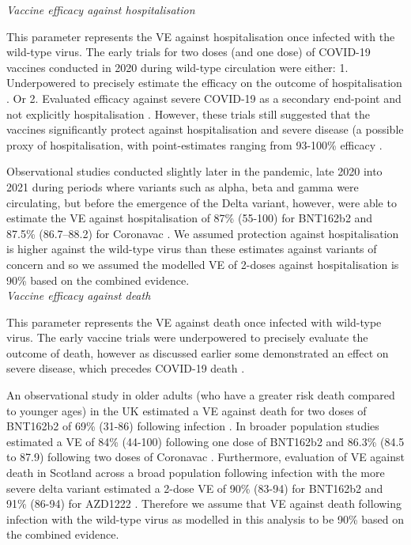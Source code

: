 \textit{Vaccine efficacy against hospitalisation}

This parameter represents the VE against hospitalisation once infected with the wild-type virus.
The early trials for two doses (and one dose) of COVID-19 vaccines conducted in 2020 during wild-type circulation were either:
1. Underpowered to precisely estimate the efficacy on the outcome of hospitalisation \cite{falsey2021, tanriover2021}.
Or
2. Evaluated efficacy against severe COVID-19 as a secondary end-point and not explicitly hospitalisation  \cite{elsahly2021, thomas2021, ella2021, alkaabi2021}.
However, these trials still suggested that the vaccines significantly protect against hospitalisation and severe disease (a possible proxy of hospitalisation, with point-estimates ranging from 93-100\% efficacy \cite{falsey2021, tanriover2021, elsahly2021, thomas2021, ella2021, alkaabi2021}.

Observational studies conducted slightly later in the pandemic, late 2020 into 2021 during periods where variants such as alpha, beta and gamma were circulating, but before the emergence 
of the Delta variant, however, were able to estimate the VE against hospitalisation of 87\% (55-100) for BNT162b2 and 87.5\%
(86.7–88.2) for Coronavac \cite{dagan2021, jara2021}. We assumed protection against hospitalisation is higher against the wild-type virus than these estimates against variants of concern 
and so we assumed the modelled VE of 2-doses against hospitalisation is 90\% based on the combined evidence.\\

\textit{Vaccine efficacy against death}

This parameter represents the VE against death once infected with wild-type virus.
The early vaccine trials were underpowered to precisely evaluate the outcome of death, however as discussed earlier some 
demonstrated an effect on severe disease, which precedes COVID-19 death \cite{elsahly2021, thomas2021, ella2021, alkaabi2021}.

An observational study in older adults (who have a greater risk death compared to younger ages) in the UK estimated a VE against death 
for two doses of BNT162b2 of 69\% (31-86) following infection \cite{lopez2021}. In broader population studies estimated a VE of 
84\% (44-100) following one dose of BNT162b2 and 86.3\% (84.5 to 87.9) following two doses of Coronavac \cite{dagan2021, jara2021}. 
Furthermore, evaluation of VE against death in Scotland across a broad population following infection with the more severe delta variant estimated a 2-dose VE of 90\% (83-94) for BNT162b2 and 91\% (86-94) for AZD1222 \cite{sheikh2021}. 
Therefore we assume that VE against death following infection with the wild-type virus as modelled in this analysis to be 90\% based on the combined evidence.

